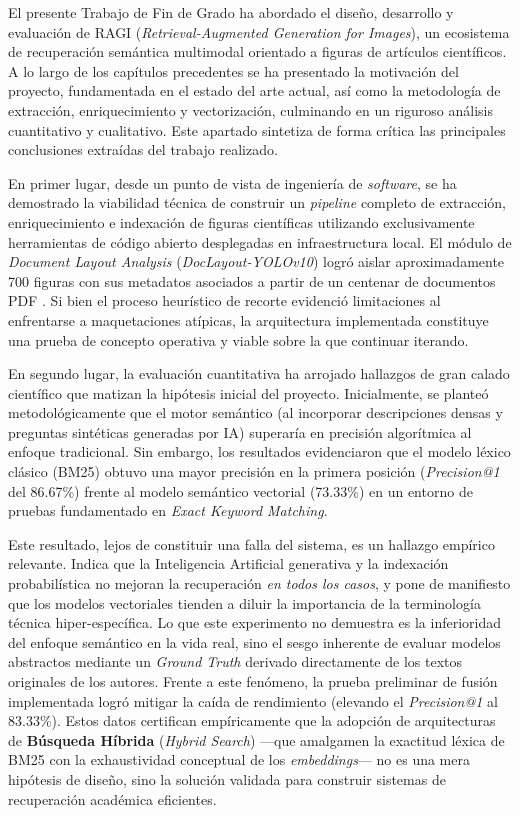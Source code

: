 \documentclass[a4paper]{report}
\begin{document}
El presente Trabajo de Fin de Grado ha abordado el diseño, desarrollo y evaluación de RAGI (\textit{Retrieval-Augmented Generation for Images}), un ecosistema de recuperación semántica multimodal orientado a figuras de artículos científicos. A lo largo de los capítulos precedentes se ha presentado la motivación del proyecto, fundamentada en el estado del arte actual, así como la metodología de extracción, enriquecimiento y vectorización, culminando en un riguroso análisis cuantitativo y cualitativo. Este apartado sintetiza de forma crítica las principales conclusiones extraídas del trabajo realizado.

En primer lugar, desde un punto de vista de ingeniería de \textit{software}, se ha demostrado la viabilidad técnica de construir un \textit{pipeline} completo de extracción, enriquecimiento e indexación de figuras científicas utilizando exclusivamente herramientas de código abierto desplegadas en infraestructura local. El módulo de \textit{Document Layout Analysis} (\textit{DocLayout-YOLOv10}) logró aislar aproximadamente 700 figuras con sus metadatos asociados a partir de un centenar de documentos PDF \cite{wang2024yolov10}. Si bien el proceso heurístico de recorte evidenció limitaciones al enfrentarse a maquetaciones atípicas, la arquitectura implementada constituye una prueba de concepto operativa y viable sobre la que continuar iterando.

En segundo lugar, la evaluación cuantitativa ha arrojado hallazgos de gran calado científico que matizan la hipótesis inicial del proyecto. Inicialmente, se planteó metodológicamente que el motor semántico (al incorporar descripciones densas y preguntas sintéticas generadas por IA) superaría en precisión algorítmica al enfoque tradicional. Sin embargo, los resultados evidenciaron que el modelo léxico clásico (BM25) obtuvo una mayor precisión en la primera posición (\textit{Precision@1} del 86.67\%) frente al modelo semántico vectorial (73.33\%) en un entorno de pruebas fundamentado en \textit{Exact Keyword Matching}. 

Este resultado, lejos de constituir una falla del sistema, es un hallazgo empírico relevante. Indica que la Inteligencia Artificial generativa y la indexación probabilística no mejoran la recuperación \textit{en todos los casos}, y pone de manifiesto que los modelos vectoriales tienden a diluir la importancia de la terminología técnica hiper-específica. Lo que este experimento no demuestra es la inferioridad del enfoque semántico en la vida real, sino el sesgo inherente de evaluar modelos abstractos mediante un \textit{Ground Truth} derivado directamente de los textos originales de los autores. Frente a este fenómeno, la prueba preliminar de fusión implementada logró mitigar la caída de rendimiento (elevando el \textit{Precision@1} al 83.33\%). Estos datos certifican empíricamente que la adopción de arquitecturas de \textbf{Búsqueda Híbrida} (\textit{Hybrid Search}) —que amalgamen la exactitud léxica de BM25 con la exhaustividad conceptual de los \textit{embeddings}— no es una mera hipótesis de diseño, sino la solución validada para construir sistemas de recuperación académica eficientes.
\end{document}
